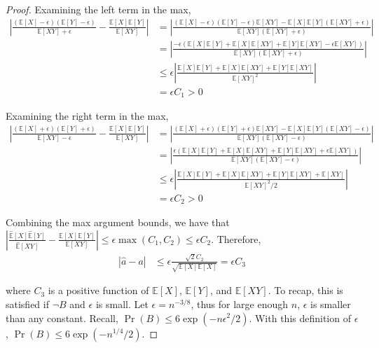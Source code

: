 \begin{proof}
Examining the left term in the max,
\begin{align}
    \left| \frac{(\mathbb{E}[X] - \epsilon)(\mathbb{E}[Y] - \epsilon)}{\mathbb{E}[XY] + \epsilon}  - \frac{\mathbb{E}[X] \mathbb{E}[Y]}{\mathbb{E}[XY]} \right| &= \left| \frac{(\mathbb{E}[X] - \epsilon)(\mathbb{E}[Y] - \epsilon)\mathbb{E}[XY] - \mathbb{E}[X] \mathbb{E}[Y] (\mathbb{E}[XY] + \epsilon)}{\mathbb{E}[XY](\mathbb{E}[XY] + \epsilon)} \right| \\
    &= \left|\frac{ -\epsilon (\mathbb{E}[X] \mathbb{E}[Y] + \mathbb{E}[X] \mathbb{E}[XY] + \mathbb{E}[Y] \mathbb{E}[XY] - \epsilon \mathbb{E}[XY])}{\mathbb{E}[XY](\mathbb{E}[XY] + \epsilon)} \right| \\
    &\leq \epsilon \left| \frac{ \mathbb{E}[X] \mathbb{E}[Y] + \mathbb{E}[X] \mathbb{E}[XY] + \mathbb{E}[Y] \mathbb{E}[XY]}{\mathbb{E}[XY]^2} \right| \\
    &= \epsilon C_1 > 0
\end{align}

Examining the right term in the max,
\begin{align}
    \left| \frac{(\mathbb{E}[X] + \epsilon)(\mathbb{E}[Y] + \epsilon)}{\mathbb{E}[XY] - \epsilon}  - \frac{\mathbb{E}[X] \mathbb{E}[Y]}{\mathbb{E}[XY]} \right| &= \left| \frac{(\mathbb{E}[X] + \epsilon)(\mathbb{E}[Y] + \epsilon)\mathbb{E}[XY] - \mathbb{E}[X] \mathbb{E}[Y] (\mathbb{E}[XY] - \epsilon)}{\mathbb{E}[XY](\mathbb{E}[XY] - \epsilon)} \right| \\
    &= \left|\frac{ \epsilon (\mathbb{E}[X] \mathbb{E}[Y] + \mathbb{E}[X] \mathbb{E}[XY] + \mathbb{E}[Y] \mathbb{E}[XY] + \epsilon \mathbb{E}[XY])}{\mathbb{E}[XY](\mathbb{E}[XY] - \epsilon)} \right| \\
    &\leq \epsilon \left| \frac{ \mathbb{E}[X] \mathbb{E}[Y] + \mathbb{E}[X] \mathbb{E}[XY] + \mathbb{E}[Y] \mathbb{E}[XY] + \mathbb{E}[XY]}{\mathbb{E}[XY]^2/2} \right| \\
    &= \epsilon C_2 > 0
\end{align}

Combining the max argument bounds, we have that $ \left| \frac{\hat{\mathbb{E}}[X] \hat{\mathbb{E}}[Y]}{\hat{\mathbb{E}}[XY]} - \frac{\mathbb{E}[X] \mathbb{E}[Y]}{\mathbb{E}[XY]} \right| \leq \epsilon \max(C_1, C_2) \leq \epsilon C_2$. Therefore, 
\begin{align}
    | \hat{a} -  a | &\leq \epsilon \frac{\sqrt{2}C_2}{\sqrt{\mathbb{E}[X] \mathbb{E}[X]}} = \epsilon C_3
\end{align}

where $C_3$ is a positive function of $\mathbb{E}[X]$, $\mathbb{E}[Y]$, and $\mathbb{E}[XY]$. To recap, this is satisfied if $\neg B$ and $\epsilon$ is small. Let $\epsilon = n^{-3/8}$, thus for large enough $n$, $\epsilon$ is smaller than any constant. Recall, $\Pr(B) \leq 6 \exp( - n \epsilon^2 / 2)$. With this definition of $\epsilon$, $\Pr(B) \leq 6 \exp(-n^{1/4}/2)$.


\end{proof}
